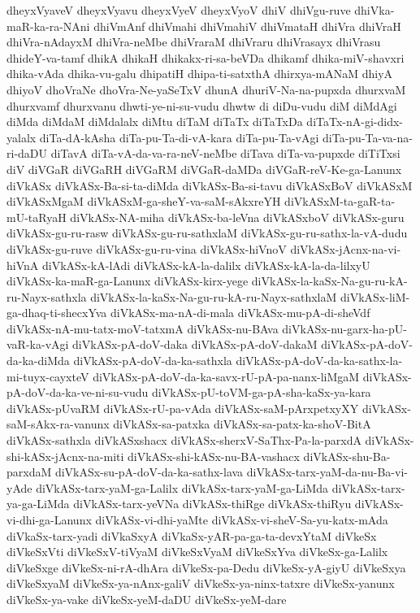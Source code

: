 {dheyxVyaveV
dheyxVyavu
dheyxVyeV
dheyxVyoV
dhiV
dhiVgu-ruve
dhiVka-maR-ka-ra-NAni
dhiVmAnf
dhiVmahi
dhiVmahiV
dhiVmataH
dhiVra
dhiVraH
dhiVra-nAdayxM
dhiVra-neMbe
dhiVraraM
dhiVraru
dhiVrasayx
dhiVrasu
dhideY-va-tamf
dhikA
dhikaH
dhikakx-ri-sa-beVDa
dhikamf
dhika-miV-shavxri
dhika-vAda
dhika-vu-galu
dhipatiH
dhipa-ti-satxthA
dhirxya-mANaM
dhiyA
dhiyoV
dhoVraNe
dhoVra-Ne-yaSeTxV
dhunA
dhuriV-Na-na-pupxda
dhurxvaM
dhurxvamf
dhurxvanu
dhwti-ye-ni-su-vudu
dhwtw
di
diDu-vudu
diM
diMdAgi
diMda
diMdaM
diMdalalx
diMtu
diTaM
diTaTx
diTaTxDa
diTaTx-nA-gi-didx-yalalx
diTa-dA-kAsha
diTa-pu-Ta-di-vA-kara
diTa-pu-Ta-vAgi
diTa-pu-Ta-va-na-ri-daDU
diTavA
diTa-vA-da-va-ra-neV-neMbe
diTava
diTa-va-pupxde
diTiTxsi
diV
diVGaR
diVGaRH
diVGaRM
diVGaR-daMDa
diVGaR-reV-Ke-ga-Lanunx
diVkASx
diVkASx-Ba-si-ta-diMda
diVkASx-Ba-si-tavu
diVkASxBoV
diVkASxM
diVkASxMgaM
diVkASxM-ga-sheY-va-saM-sAkxreYH
diVkASxM-ta-gaR-ta-mU-taRyaH
diVkASx-NA-miha
diVkASx-ba-leVna
diVkASxboV
diVkASx-guru
diVkASx-gu-ru-rasw
diVkASx-gu-ru-sathxlaM
diVkASx-gu-ru-sathx-la-vA-dudu
diVkASx-gu-ruve
diVkASx-gu-ru-vina
diVkASx-hiVnoV
diVkASx-jAcnx-na-vi-hiVnA
diVkASx-kA-lAdi
diVkASx-kA-la-dalilx
diVkASx-kA-la-da-lilxyU
diVkASx-ka-maR-ga-Lanunx
diVkASx-kirx-yege
diVkASx-la-kaSx-Na-gu-ru-kA-ru-Nayx-sathxla
diVkASx-la-kaSx-Na-gu-ru-kA-ru-Nayx-sathxlaM
diVkASx-liM-ga-dhaq-ti-shecxYva
diVkASx-ma-nA-di-mala
diVkASx-mu-pA-di-sheVdf
diVkASx-nA-mu-tatx-moV-tatxmA
diVkASx-nu-BAva
diVkASx-nu-garx-ha-pU-vaR-ka-vAgi
diVkASx-pA-doV-daka
diVkASx-pA-doV-dakaM
diVkASx-pA-doV-da-ka-diMda
diVkASx-pA-doV-da-ka-sathxla
diVkASx-pA-doV-da-ka-sathx-la-mi-tuyx-cayxteV
diVkASx-pA-doV-da-ka-savx-rU-pA-pa-nanx-liMgaM
diVkASx-pA-doV-da-ka-ve-ni-su-vudu
diVkASx-pU-toVM-ga-pA-sha-kaSx-ya-kara
diVkASx-pUvaRM
diVkASx-rU-pa-vAda
diVkASx-saM-pArxpetxyXY
diVkASx-saM-sAkx-ra-vanunx
diVkASx-sa-patxka
diVkASx-sa-patx-ka-shoV-BitA
diVkASx-sathxla
diVkASxshacx
diVkASx-sherxV-SaThx-Pa-la-parxdA
diVkASx-shi-kASx-jAcnx-na-miti
diVkASx-shi-kASx-nu-BA-vashacx
diVkASx-shu-Ba-parxdaM
diVkASx-su-pA-doV-da-ka-sathx-lava
diVkASx-tarx-yaM-da-nu-Ba-vi-yAde
diVkASx-tarx-yaM-ga-Lalilx
diVkASx-tarx-yaM-ga-LiMda
diVkASx-tarx-ya-ga-LiMda
diVkASx-tarx-yeVNa
diVkASx-thiRge
diVkASx-thiRyu
diVkASx-vi-dhi-ga-Lanunx
diVkASx-vi-dhi-yaMte
diVkASx-vi-sheV-Sa-yu-katx-mAda
diVkaSx-tarx-yadi
diVkaSxyA
diVkaSx-yAR-pa-ga-ta-devxYtaM
diVkeSx
diVkeSxVti
diVkeSxV-tiVyaM
diVkeSxVyaM
diVkeSxYva
diVkeSx-ga-Lalilx
diVkeSxge
diVkeSx-ni-rA-dhAra
diVkeSx-pa-Dedu
diVkeSx-yA-giyU
diVkeSxya
diVkeSxyaM
diVkeSx-ya-nAnx-galiV
diVkeSx-ya-ninx-tatxre
diVkeSx-yanunx
diVkeSx-ya-vake
diVkeSx-yeM-daDU
diVkeSx-yeM-dare
}
